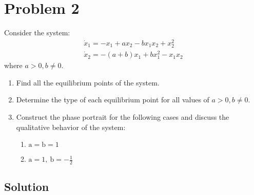 \section*{Problem 2}

Consider the system:
\begin{equation*}
    \begin{gathered}
        \dot{x}_{1}=-x_{1}+a x_{2}-b x_{1} x_{2}+x_{2}^{2} \\
        \dot{x}_{2}=-(a+b) x_{1}+b x_{1}^{2}-x_{1} x_{2}
    \end{gathered}
\end{equation*}
where \( a>0, b \neq 0 \).

\begin{enumerate}[label= (\alph*)]
    \item Find all the equilibrium points of the system.
    \item Determine the type of each equilibrium point for all values of \( a>0, b \neq 0 \).
    \item Construct the phase portrait for the following cases and discuss the qualitative behavior of the system:
          \begin{enumerate}[label= (\roman*)]
              \item \( \mathrm{a}=\mathrm{b}=1 \)
              \item \( \mathrm{a}=1, \mathrm{~b}=-\frac{1}{2} \)
          \end{enumerate}
\end{enumerate}

\subsection*{Solution}
